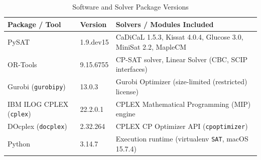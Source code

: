 \documentclass[a4paper,fleqn]{cas-sc}
\begin{document}
\begin{table}[htbp]
\centering
\caption{Software and Solver Package Versions} \label{tab:software_versions}
\begin{tabular}{lll}
\toprule
Package / Tool & Version & Solvers / Modules Included \\
\midrule
PySAT & 1.9.dev15 & CaDiCaL 1.5.3, Kissat 4.0.4, Glucose 3.0, MiniSat 2.2, MapleCM \\
OR-Tools & 9.15.6755 & CP-SAT solver, Linear Solver (CBC, SCIP interfaces) \\
Gurobi (\texttt{gurobipy}) & 13.0.3 & Gurobi Optimizer (size-limited (restricted) license) \\
IBM ILOG CPLEX (\texttt{cplex}) & 22.2.0.1 & CPLEX Mathematical Programming (MIP) engine \\
DOcplex (\texttt{docplex}) & 2.32.264 & CPLEX CP Optimizer API (\texttt{cpoptimizer}) \\
Python & 3.14.7 & Execution runtime (virtualenv \texttt{SAT}, macOS 15.7.4) \\
\bottomrule
\end{tabular}
\end{table}
\end{document}
